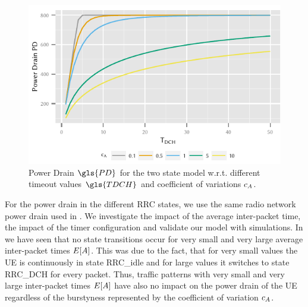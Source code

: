 \begin{figure}
	\centering
	\includegraphics{network/performance_model/numerical_examples/figures/2state_tdch_pd}
	\caption{Power Drain \(\gls{PD}\) for the two state model w.r.t. different timeout values \(\gls{TDCH}\) and coefficient of variations \(c_{A}\).}
	\label{fig:network:performance_model:numerical_examples:validations:analytic_vs_simulation:2state_tdch_pd}
\end{figure}

For the power drain in the different \gls{RRC} states, we use the same radio network power drain  used in .
We investigate the impact of the average inter-packet time, the impact of the timer configuration and validate our model with simulations. 
In  we have seen that no state transitions occur for very small and very large average inter-packet times \(E[A]\).
This was due to the fact, that for very small values the \gls{UE} is continuously in state \gls{RRC_idle} and for large values it switches to state \gls{RRC_DCH} for every packet.
Thus, traffic patterns with very small and very large inter-packet times \(E[A]\) have also no impact on the power drain of the \gls{UE} regardless of the burstyness represented by the coefficient of variation \(c_{A}\).


